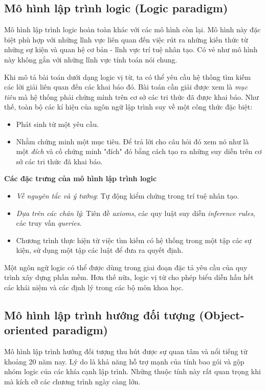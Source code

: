 \documentclass[10pt, a4paper]{article}
\begin{document}
\subsection{Mô hình lập trình logic (Logic paradigm)}

Mô hình lập trình logic hoàn toàn khác với các mô hình còn lại. Mô hình này đặc biệt phù hợp với những lĩnh vực liên quan đến việc rút ra những kiến thức từ những sự kiện và quan hệ cơ bản - lĩnh vực trí tuệ nhân tạo. Có vẻ như mô hình này không gắn với những lĩnh vực tính toán nói chung.

Khi mô tả bài toán dưới dạng logic vị từ, ta có thể yêu cầu hệ thống tìm kiếm các lời giải liên quan đến các khai báo đó. Bài toán cần giải được xem là \emph{mục tiêu} mà hệ thống phải chứng mình trên cơ sở các tri thức đã được khai báo.
Như thế, toàn bộ các kí hiệu của ngôn ngữ lập trình suy về một công thức đặc biệt:
\begin{itemize}
\item Phát sinh từ một yêu cầu.
\item Nhằm chứng minh một mục tiêu. Để trả lời cho câu hỏi đó xem nó như là một \emph{đích} và cố chứng minh "đích" đó bằng cách tạo ra những suy diễn trên cơ sở các tri thức đã khai báo.\\
\end{itemize}

\textbf{Các đặc trưng của mô hình lập trình logic}
\begin{itemize}
\item \textit{Về nguyên tắc và ý tưởng}: Tự động kiểm chứng trong trí tuệ nhân tạo.
\item \textit{Dựa trên các chân lý}: Tiên đề \emph{axioms}, các quy luật suy diễn \emph{inference rules}, các truy vấn \emph{queries}.
\item Chương trình thực hiện từ việc tìm kiếm có hệ thống trong một tập các sự kiện, sử dụng một tập các luật để đưa ra quyết định.
\end{itemize}

Một ngôn ngữ logic có thể được dùng trong giai đoạn đặc tả yêu cầu của quy trình xây dựng phần mềm. Hơn thế nữa, logic vị từ cho phép biểu diễn hầu hết các khái niệm và các định lý trong các bộ môn khoa học.

\subsection{Mô hình lập trình hướng đối tượng (Object-oriented paradigm)}

Mô hình lập trình hướng đối tượng thu hút được sự quan tâm và nổi tiếng từ khoảng 20 năm nay. Lý do là khả năng hỗ trợ mạnh của tính bao gói và gộp nhóm logic của các khía cạnh lập trình. Những thuộc tính này rất quan trọng khi mà kích cỡ các chương trình ngày càng lớn.
\end{document}
